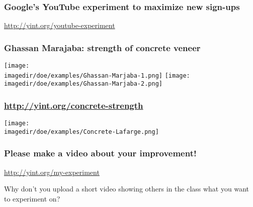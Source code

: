 \documentclass[handout,11pt,aspectratio=169,mathserif]{beamer}
\begin{document}
\begin{frame}\frametitle{Google's YouTube experiment to maximize new sign-ups}
	\begin{center}
		\Huge{\href{http://yint.org/youtube-experiment}{http://yint.org/youtube-experiment}}
	\end{center}	
\end{frame}

\begin{frame}\frametitle{Ghassan Marajaba: strength of concrete veneer}
	\begin{center}
		\texttt{[image: \\imagedir/doe/examples/Ghassan-Marjaba-1.png]}
		\texttt{[image: \\imagedir/doe/examples/Ghassan-Marjaba-2.png]}
	\end{center}
\end{frame}

\begin{frame}\frametitle{\href{http://yint.org/concrete-strength}{http://yint.org/concrete-strength}}
	\begin{center}
		\texttt{[image: \\imagedir/doe/examples/Concrete-Lafarge.png]}
	\end{center}
\end{frame}

\begin{frame}\frametitle{Please make a video about your improvement!}
	{\Huge \href{http://yint.org/my-experiment}{http://yint.org/my-experiment}
	
	\vspace{24pt}	
	Why don't you upload a short video showing others in the class what you want to experiment on?	
	}
\end{frame}


\end{document}
